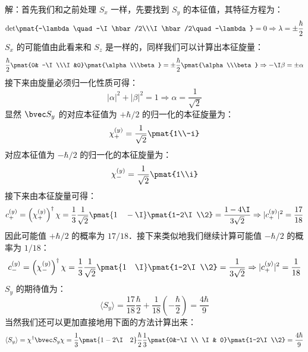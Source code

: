\begin{example}{}
解：首先我们和之前处理 $S_x$ 一样，先要找到 $S_y$ 的本征值，其特征方程为：
\begin{equation}
\rm{det}\pmat{-\lambda \quad -\I\hbar/2\\\I\hbar/2\quad -\lambda}=0\Rightarrow\lambda=\pm\frac{\hbar}{2}
\end{equation}
$S_x$ 的可能值由此看来和 $S_z$ 是一样的，同样我们可以计算出本征旋量：
\begin{equation}
\frac{\hbar}{2}\pmat{0& -\I\\\I&0}\pmat{\alpha\\\beta}=\pm\frac{\hbar}{2}\pmat{\alpha\\\beta} \Rightarrow -\I\beta=\pm\alpha
\end{equation}
接下来由旋量必须归一化性质可得：
\begin{equation}
|\alpha|^2+|\beta|^2=1\Rightarrow\alpha=\frac{1}{\sqrt{2}}
\end{equation}
显然 $\bvec S_y$ 的对应本征值为 $+\hbar/2$ 的归一化的本征旋量为：
\begin{equation}
\chi_+^{(y)}=\frac{1}{\sqrt{2}}\pmat{1\\-i}
\end{equation}
对应本征值为 $-\hbar/2$ 的归一化的本征旋量为：
\begin{equation}
\chi_-^{(y)}=\frac{1}{\sqrt{2}}\pmat{1\\i}
\end{equation}
接下来由本征旋量可得：
\begin{equation}
c_+^{(y)}=\left(\chi_+^{(y)}\right)^\dagger\chi=\frac{1}{3}\frac{1}{\sqrt{2}}\pmat{1\quad -\I}\pmat{1-2\I\\2}=\frac{1-4\I}{3\sqrt{2}}\Rightarrow |c_+^{(y)}|^2=\frac{17}{18}
\end{equation}
因此可能值 $+\hbar/2$ 的概率为 $17/18$．接下来类似地我们继续计算可能值 $-\hbar/2$ 的概率为 $1/18$：
\begin{equation}
c_-^{(y)}=\left(\chi_-^{(y)}\right)^\dagger\chi=\frac{1}{3}\frac{1}{\sqrt{2}}\pmat{1\quad \I}\pmat{1-2\I\\2}=\frac{1}{3\sqrt{2}}\Rightarrow |c_+^{(y)}|^2=\frac{1}{18}
\end{equation}
$S_y$ 的期待值为：
\begin{equation}
\langle S_y \rangle =\frac{17}{18}\frac{\hbar}{2}+\frac{1}{18}\left(-\frac{\hbar}{2}\right)=\frac{4\hbar}{9}
\end{equation}
当然我们还可以更加直接地用下面的方法计算出来：
\begin{equation}
\langle S_y \rangle = \chi^\dagger\bvec S_y\chi = \frac{1}{3}\pmat{1-2\I\quad 2}\frac{\hbar}{2}\frac{1}{3}\pmat{0&-\I\\ \I& 0}\pmat{1-2\I\\2}=\frac{4\hbar}{9}
\end{equation}

\end{example}

